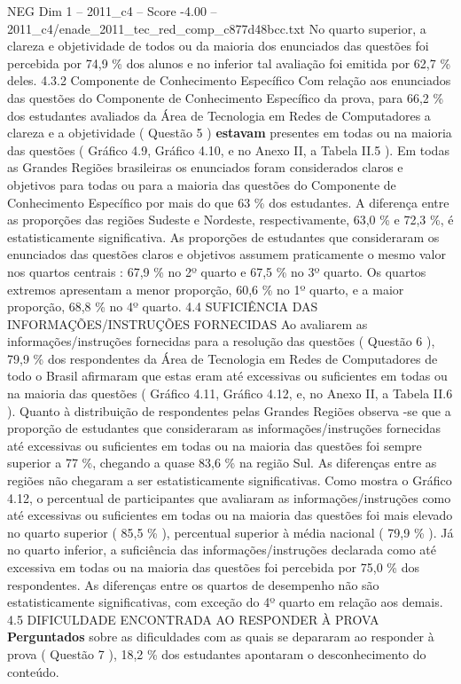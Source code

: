 \begin{textsample}{NEG Dim 1 – 2011\_c4 – Score -4.00 – 2011\_c4/enade\_2011\_tec\_red\_comp\_c877d48bcc.txt}
No quarto superior, a clareza e objetividade de todos ou da maioria dos enunciados das questões foi percebida por 74,9 \% dos alunos e no inferior tal avaliação foi emitida por 62,7 \% deles. 4.3.2 Componente de Conhecimento Específico Com relação aos enunciados das questões do Componente de Conhecimento Específico da prova, para 66,2 \% dos estudantes avaliados da Área de Tecnologia em Redes de Computadores a clareza e a objetividade ( Questão 5 ) \textbf{estavam} presentes em todas ou na maioria das questões ( Gráfico 4.9, Gráfico 4.10, e no Anexo II, a Tabela II.5 ).
Em todas as Grandes Regiões brasileiras os enunciados foram considerados claros e objetivos para todas ou para a maioria das questões do Componente de Conhecimento Específico por mais do que 63 \% dos estudantes.
A diferença entre as proporções das regiões Sudeste e Nordeste, respectivamente, 63,0 \% e 72,3 \%, é estatisticamente significativa.
As proporções de estudantes que consideraram os enunciados das questões claros e objetivos assumem praticamente o mesmo valor nos quartos centrais : 67,9 \% no 2º quarto e 67,5 \% no 3º quarto.
Os quartos extremos apresentam a menor proporção, 60,6 \% no 1º quarto, e a maior proporção, 68,8 \% no 4º quarto. 4.4 SUFICIÊNCIA DAS INFORMAÇÕES/INSTRUÇÕES FORNECIDAS Ao avaliarem as informações/instruções fornecidas para a resolução das questões ( Questão 6 ), 79,9 \% dos respondentes da Área de Tecnologia em Redes de Computadores de todo o Brasil afirmaram que estas eram até excessivas ou suficientes em todas ou na maioria das questões ( Gráfico 4.11, Gráfico 4.12, e, no Anexo II, a Tabela II.6 ).
Quanto à distribuição de respondentes pelas Grandes Regiões observa -se que a proporção de estudantes que consideraram as informações/instruções fornecidas até excessivas ou suficientes em todas ou na maioria das questões foi sempre superior a 77 \%, chegando a quase 83,6 \% na região Sul.
As diferenças entre as regiões não chegaram a ser estatisticamente significativas.
Como mostra o Gráfico 4.12, o percentual de participantes que avaliaram as informações/instruções como até excessivas ou suficientes em todas ou na maioria das questões foi mais elevado no quarto superior ( 85,5 \% ), percentual superior à média nacional ( 79,9 \% ).
Já no quarto inferior, a suficiência das informações/instruções declarada como até excessiva em todas ou na maioria das questões foi percebida por 75,0 \% dos respondentes.
As diferenças entre os quartos de desempenho não são estatisticamente significativas, com exceção do 4º quarto em relação aos demais. 4.5 DIFICULDADE ENCONTRADA AO RESPONDER À PROVA \textbf{Perguntados} sobre as dificuldades com as quais se depararam ao responder à prova ( Questão 7 ), 18,2 \% dos estudantes apontaram o desconhecimento do conteúdo.

\end{textsample}

